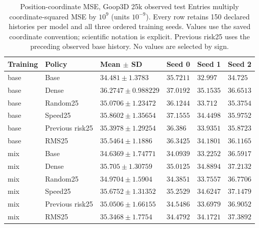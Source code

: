 \begin{table}[p]
\centering\scriptsize
\caption{Position-coordinate MSE, Goop3D 25k observed test Entries multiply coordinate-squared MSE by $10^9$ (units $10^{-9}$). Every row retains 150 declared histories per model and all three ordered training seeds. Values use the saved coordinate convention; scientific notation is explicit. Previous risk25 uses the preceding observed base history. No values are selected by sign.}
\label{tab:goop3d25k-observed-position-test}
\setlength{\tabcolsep}{3pt}
\begin{tabular}{llllll}
\toprule
Training & Policy & Mean $\pm$ SD & Seed 0 & Seed 1 & Seed 2\\
\midrule
base & Base & $34.481\pm1.3783$ & $35.7211$ & $32.997$ & $34.725$\\
base & Dense & $36.2747\pm0.988229$ & $37.0192$ & $35.1535$ & $36.6513$\\
base & Random25 & $35.0706\pm1.23472$ & $36.1244$ & $33.712$ & $35.3754$\\
base & Speed25 & $35.8602\pm1.35654$ & $37.1555$ & $34.4498$ & $35.9752$\\
base & Previous risk25 & $35.3978\pm1.29254$ & $36.386$ & $33.9351$ & $35.8723$\\
base & RMS25 & $35.5464\pm1.1886$ & $36.3425$ & $34.1801$ & $36.1165$\\
mix & Base & $34.6369\pm1.74771$ & $34.0939$ & $33.2252$ & $36.5917$\\
mix & Dense & $35.705\pm1.30759$ & $35.0125$ & $34.8894$ & $37.2132$\\
mix & Random25 & $34.9704\pm1.5904$ & $34.3851$ & $33.7557$ & $36.7706$\\
mix & Speed25 & $35.6752\pm1.31352$ & $35.2529$ & $34.6247$ & $37.1479$\\
mix & Previous risk25 & $35.0506\pm1.66155$ & $34.5486$ & $33.6979$ & $36.9052$\\
mix & RMS25 & $35.3468\pm1.7754$ & $34.4792$ & $34.1721$ & $37.3892$\\
\bottomrule
\end{tabular}
\end{table}

